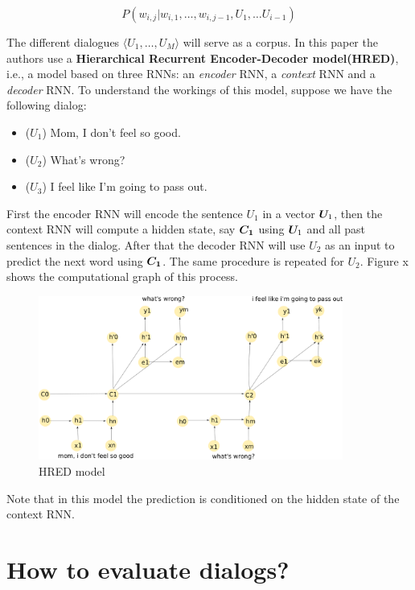 \begin{equation}
P(w_{i,j} | w_{i,1}, \dots , w_{i,j-1}, U_{1}, \dots U_{i-1})
\end{equation}

The different dialogues $\langle U_1 , \dots, U_M \rangle$ will serve as a corpus.
In this paper the authors use a \textbf{Hierarchical Recurrent Encoder-Decoder model(HRED)}, i.e., a model based on three RNNs: an \textit{encoder} RNN, a \textit{context} RNN and a \textit{decoder} RNN.  To understand the workings of this model, suppose we have the following dialog:
\begin{itemize}
\item ($U_1$) Mom, I don't feel so good.\\
\item ($U_2$) What's wrong?\\
\item ($U_3$) I feel like I'm going to pass out.
\end{itemize}

First the encoder RNN will encode the sentence $U_1$ in a vector $\bm{U}_1$, then the context RNN will compute a hidden state, say $\bm{C_1}$ using $\bm{U}_1$ and all past sentences in the dialog. After that the decoder RNN will use $U_2$ as an input to predict the next word using $\bm{C_1}$. The same procedure is repeated for $U_2$. Figure
x shows the computational graph of this process.

\begin{figure}[ht!]
\label{HRED}
\includegraphics[width=10cm]{img/HRED_placeholder.png}
\caption{HRED model}
\end{figure}

Note that in this model the prediction is conditioned on the hidden state of the context RNN.



\section{How to evaluate dialogs?}

